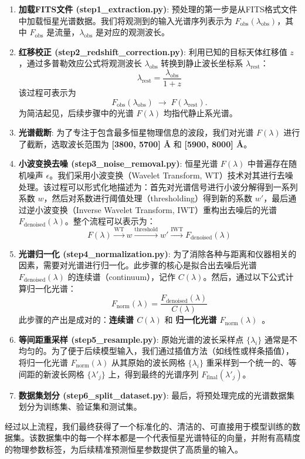 \begin{enumerate}
    \item \textbf{加载FITS文件 (step1\_extraction.py)}:  
    预处理的第一步是从FITS格式文件中加载恒星光谱数据。我们将观测到的输入光谱序列表示为 $F_{\mathrm{obs}}(\lambda_{\mathrm{obs}})$，其中 $F_{\mathrm{obs}}$ 是流量，$\lambda_{\mathrm{obs}}$ 是对应的观测波长。
    
    \item \textbf{红移校正 (step2\_redshift\_correction.py)}:  
    利用已知的目标天体红移值 $z$，通过多普勒效应公式将观测波长 $\lambda_{\mathrm{obs}}$ 转换到静止波长坐标系 $\lambda_{\mathrm{rest}}$：
    \begin{equation}
        \lambda_{\mathrm{rest}} = \frac{\lambda_{\mathrm{obs}}}{1+z}
    \end{equation}
    该过程可表示为
    \[
        F_{\mathrm{obs}}(\lambda_{\mathrm{obs}}) \;\rightarrow\; F(\lambda_{\mathrm{rest}}).
    \]
    为简洁起见，后续步骤中的光谱 $F(\lambda)$ 均指代静止系光谱。    
    \item \textbf{光谱截断}:  
    为了专注于包含最多恒星物理信息的波段，我们对光谱 $F(\lambda)$ 进行了截断，选取波长范围为 \textbf{[3800, 5700] \AA} 和 \textbf{[5900, 8000] \AA}。
    \item \textbf{小波变换去噪 (step3\_noise\_removal.py)}:  
    恒星光谱 $F(\lambda)$ 中普遍存在随机噪声 $\epsilon$。我们采用小波变换（Wavelet Transform, WT）技术对其进行去噪处理。该过程可以形式化地描述为：首先对光谱信号进行小波分解得到一系列系数 $w$，然后对系数进行阈值处理（thresholding）得到新的系数 $w'$，最后通过逆小波变换（Inverse Wavelet Transform, IWT）重构出去噪后的光谱 $F_{\mathrm{denoised}}(\lambda)$。整个流程可以表示为：
    \begin{equation}
        F(\lambda) \xrightarrow{\mathrm{WT}} w 
        \xrightarrow{\text{threshold}} w' 
        \xrightarrow{\mathrm{IWT}} F_{\mathrm{denoised}}(\lambda)
    \end{equation}    
    \item \textbf{光谱归一化 (step4\_normalization.py)}:  
    为了消除各种与距离和仪器相关的因素，需要对光谱进行归一化。此步骤的核心是拟合出去噪后光谱 $F_{\mathrm{denoised}}(\lambda)$ 的连续谱（continuum），记作 $C(\lambda)$。然后，通过以下公式计算归一化光谱：
    \begin{equation}
        F_{\mathrm{norm}}(\lambda) = \frac{F_{\mathrm{denoised}}(\lambda)}{C(\lambda)}
    \end{equation}
    此步骤的产出是成对的：\textbf{连续谱 $C(\lambda)$} 和 \textbf{归一化光谱 $F_{\mathrm{norm}}(\lambda)$}~\citep{Aoki2007}。
    \item \textbf{等间距重采样 (step5\_resample.py)}:  
    原始光谱的波长采样点 $\{\lambda_i\}$ 通常是不均匀的。为了便于后续模型输入，我们通过插值方法（如线性或样条插值），将归一化光谱 $F_{\mathrm{norm}}(\lambda)$ 从其原始的波长网格 $\{\lambda_i\}$ 重采样到一个统一的、等间距的新波长网格 $\{\lambda'_j\}$ 上，得到最终的光谱序列 $F_{\mathrm{final}}(\lambda'_j)$。
    \item \textbf{数据集划分 (step6\_split\_dataset.py)}:  
    最后，将预处理完成的光谱数据集划分为训练集、验证集和测试集。
\end{enumerate}

经过以上流程，我们最终获得了一个标准化的、清洁的、可直接用于模型训练的数据集。该数据集中的每一个样本都是一个代表恒星光谱特征的向量，并附有高精度的物理参数标签，为后续精准预测恒星参数提供了高质量的输入。